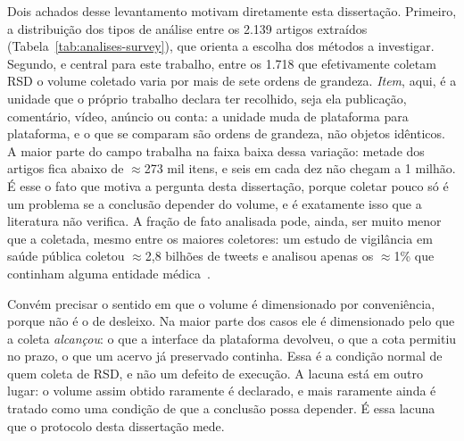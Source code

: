 Dois achados desse levantamento motivam diretamente esta dissertação. Primeiro, a
distribuição dos tipos de análise entre os 2.139 artigos extraídos
(Tabela~\ref{tab:analises-survey}), que orienta a escolha dos métodos a investigar.
Segundo, e central para este trabalho, entre os 1.718 que efetivamente coletam RSD
o volume coletado varia por mais de sete ordens de grandeza. \emph{Item}, aqui,
é a unidade que o próprio trabalho declara ter recolhido, seja ela
publicação, comentário, vídeo, anúncio ou conta: a unidade muda de plataforma para
plataforma, e o que se comparam são ordens de grandeza, não objetos idênticos. A
maior parte do campo trabalha na faixa baixa dessa variação: metade dos artigos
fica abaixo de $\approx$273 mil itens, e seis em cada dez não chegam a 1 milhão.
É esse o fato que motiva a pergunta desta dissertação, porque coletar pouco só é um
problema se a conclusão depender do volume, e é exatamente isso que a literatura
não verifica. A fração de fato analisada pode, ainda, ser muito menor que a
coletada, mesmo entre os maiores coletores: um estudo de vigilância em saúde
pública coletou $\approx$2,8 bilhões de tweets e analisou apenas os
$\approx$1\% que continham alguma entidade
médica~\cite{jimeno2015surveillance}.

Convém precisar o sentido em que o volume é dimensionado por conveniência, porque
não é o de desleixo. Na maior parte dos casos ele é dimensionado pelo que a coleta
\emph{alcançou}: o que a interface da plataforma devolveu, o que a cota permitiu no
prazo, o que um acervo já preservado continha. Essa é a condição normal de quem
coleta de RSD, e não um defeito de execução. A lacuna está em outro lugar: o
volume assim obtido raramente é declarado, e mais raramente ainda é tratado como
uma condição de que a conclusão possa depender. É essa lacuna que o protocolo
desta dissertação mede.

